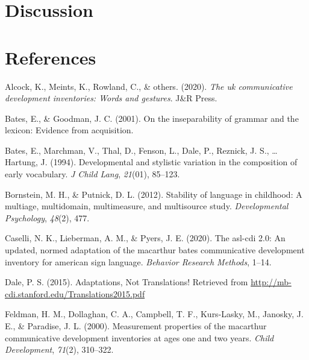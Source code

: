 \documentclass[
  english,
  man]{apa7}
\begin{document}
\hypertarget{discussion}{%
\section{Discussion}\label{discussion}}

\newpage

\hypertarget{references}{%
\section{References}\label{references}}

\begingroup
\setlength{\parindent}{-0.5in}
\setlength{\leftskip}{0.5in}

\hypertarget{refs}{}
\leavevmode\hypertarget{ref-Alcock2020}{}%
Alcock, K., Meints, K., Rowland, C., \& others. (2020). \emph{The uk communicative development inventories: Words and gestures}. J\&R Press.

\leavevmode\hypertarget{ref-Bates2001}{}%
Bates, E., \& Goodman, J. C. (2001). On the inseparability of grammar and the lexicon: Evidence from acquisition.

\leavevmode\hypertarget{ref-bates1994}{}%
Bates, E., Marchman, V., Thal, D., Fenson, L., Dale, P., Reznick, J. S., \ldots{} Hartung, J. (1994). Developmental and stylistic variation in the composition of early vocabulary. \emph{J Child Lang}, \emph{21}(01), 85--123.

\leavevmode\hypertarget{ref-bornstein2012}{}%
Bornstein, M. H., \& Putnick, D. L. (2012). Stability of language in childhood: A multiage, multidomain, multimeasure, and multisource study. \emph{Developmental Psychology}, \emph{48}(2), 477.

\leavevmode\hypertarget{ref-Caselli2020}{}%
Caselli, N. K., Lieberman, A. M., \& Pyers, J. E. (2020). The asl-cdi 2.0: An updated, normed adaptation of the macarthur bates communicative development inventory for american sign language. \emph{Behavior Research Methods}, 1--14.

\leavevmode\hypertarget{ref-dale2015}{}%
Dale, P. S. (2015). Adaptations, Not Translations! Retrieved from \url{http://mb-cdi.stanford.edu/Translations2015.pdf}

\leavevmode\hypertarget{ref-feldman2000}{}%
Feldman, H. M., Dollaghan, C. A., Campbell, T. F., Kurs-Lasky, M., Janosky, J. E., \& Paradise, J. L. (2000). Measurement properties of the macarthur communicative development inventories at ages one and two years. \emph{Child Development}, \emph{71}(2), 310--322.
\end{document}
